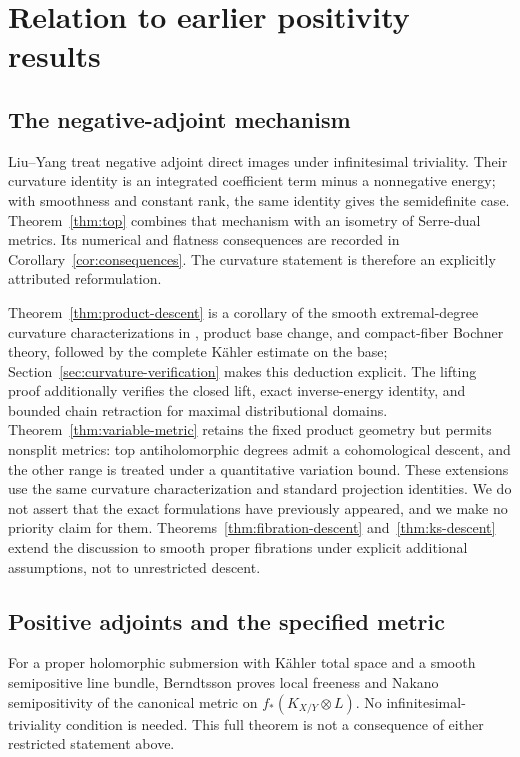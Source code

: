 \documentclass[11pt,reqno]{amsart}
\numberwithin{equation}{section}
\theoremstyle{definition}
\theoremstyle{remark}
\begin{document}
\section{Relation to earlier positivity results}\label{sec:literature}

\subsection{The negative-adjoint mechanism}
Liu--Yang \cite[Theorem 4.1]{LY14} treat negative adjoint direct images under infinitesimal triviality. Their curvature identity is an integrated coefficient term minus a nonnegative energy; with smoothness and constant rank, the same identity gives the semidefinite case. Theorem~\ref{thm:top} combines that mechanism with an isometry of Serre-dual metrics. Its numerical and flatness consequences are recorded in Corollary~\ref{cor:consequences}. The curvature statement is therefore an explicitly attributed reformulation.

Theorem~\ref{thm:product-descent} is a corollary of the smooth extremal-degree curvature characterizations in \cite[Theorems 1.5--1.6]{Wat21}, product base change, and compact-fiber Bochner theory, followed by the complete K\"ahler estimate on the base; Section~\ref{sec:curvature-verification} makes this deduction explicit. The lifting proof additionally verifies the closed lift, exact inverse-energy identity, and bounded chain retraction for maximal distributional domains. Theorem~\ref{thm:variable-metric} retains the fixed product geometry but permits nonsplit metrics: top antiholomorphic degrees admit a cohomological descent, and the other range is treated under a quantitative variation bound. These extensions use the same curvature characterization and standard projection identities. We do not assert that the exact formulations have previously appeared, and we make no priority claim for them. Theorems~\ref{thm:fibration-descent} and~\ref{thm:ks-descent} extend the discussion to smooth proper fibrations under explicit additional assumptions, not to unrestricted descent.

\subsection{Positive adjoints and the specified metric}
For a proper holomorphic submersion with K\"ahler total space and a smooth semipositive line bundle, Berndtsson \cite[Theorem 1.2]{Ber09} proves local freeness and Nakano semipositivity of the canonical metric on $f_*(K_{X/Y}\otimes L)$. No infinitesimal-triviality condition is needed. This full theorem is not a consequence of either restricted statement above.
\end{document}
